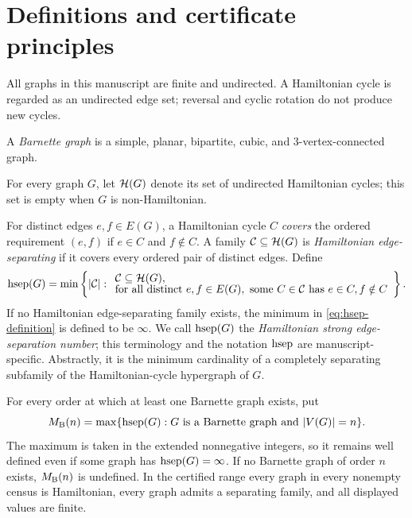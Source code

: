 \section{Definitions and certificate principles}
\label{sec:preliminaries}

All graphs in this manuscript are finite and undirected.  A Hamiltonian cycle
is regarded as an undirected edge set; reversal and cyclic rotation do not
produce new cycles.

\begin{definition}
A \emph{Barnette graph} is a simple, planar, bipartite, cubic, and
3-vertex-connected graph.
\end{definition}

For every graph \(G\), let \(\mathcal{H}(G)\) denote its set of undirected Hamiltonian
cycles; this set is empty when \(G\) is non-Hamiltonian.

\begin{definition}
\label{def:hsep}
For distinct edges \(e,f\in E(G)\), a Hamiltonian cycle \(C\) \emph{covers} the
ordered requirement \((e,f)\) if \(e\in C\) and \(f\notin C\).  A family
\(\mathcal{C}\subseteq\mathcal{H}(G)\) is \emph{Hamiltonian edge-separating} if it covers
every ordered pair of distinct edges.  Define
\begin{equation}
\label{eq:hsep-definition}
 \operatorname{hsep}(G)=
 \min\left\{ |\mathcal{C}|:
 \begin{array}{l}
 \mathcal{C}\subseteq\mathcal{H}(G),\\[-2pt]
 \text{for all distinct }e,f\in E(G),
 \text{ some }C\in\mathcal{C}\text{ has }e\in C, f\notin C
 \end{array}
 \right\}.
\end{equation}
If no Hamiltonian edge-separating family exists, the minimum in
\cref{eq:hsep-definition} is defined to be \(\infty\).  We call \(\operatorname{hsep}(G)\)
the \emph{Hamiltonian strong edge-separation number}; this terminology and the
notation \(\operatorname{hsep}\) are manuscript-specific.  Abstractly, it is the minimum
cardinality of a completely separating subfamily of the Hamiltonian-cycle
hypergraph of \(G\).
\end{definition}

\begin{definition}
For every order at which at least one Barnette graph exists, put
\begin{equation}
\label{eq:MB-definition}
 M_{\mathrm B}(n)=\max\{\operatorname{hsep}(G):G\text{ is a Barnette graph and }|V(G)|=n\}.
\end{equation}
The maximum is taken in the extended nonnegative integers, so it remains well
defined even if some graph has \(\operatorname{hsep}(G)=\infty\).  If no Barnette graph of
order \(n\) exists, \(M_{\mathrm B}(n)\) is undefined.  In the certified range every
graph in every nonempty census is Hamiltonian, every graph admits a separating
family, and all displayed values are finite.
\end{definition}

